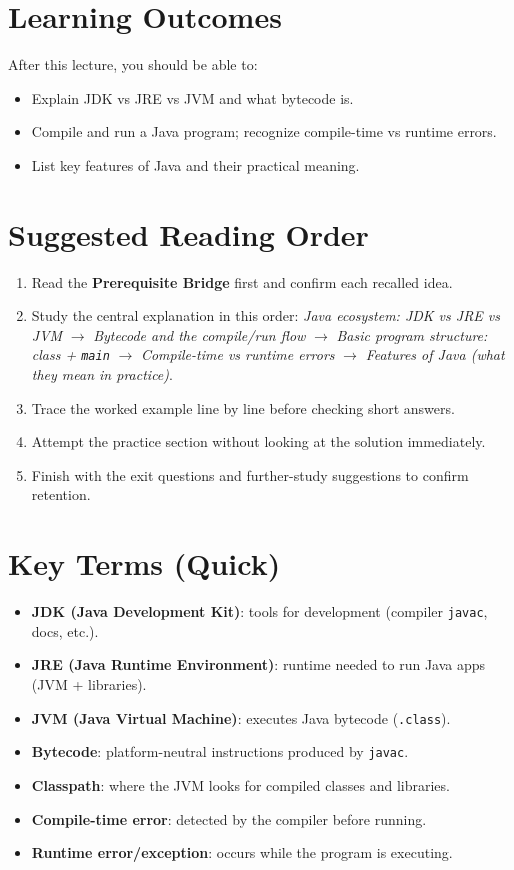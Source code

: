 \documentclass[11pt]{article}
\begin{document}
\section{Learning Outcomes}
After this lecture, you should be able to:
\begin{itemize}
  \item Explain JDK vs JRE vs JVM and what bytecode is.
  \item Compile and run a Java program; recognize compile-time vs runtime errors.
  \item List key features of Java and their practical meaning.
\end{itemize}

\section{Suggested Reading Order}
\begin{enumerate}
  \item Read the \textbf{Prerequisite Bridge} first and confirm each recalled idea.
  \item Study the central explanation in this order: \textit{Java ecosystem: JDK vs JRE vs JVM} $\rightarrow$ \textit{Bytecode and the compile/run flow} $\rightarrow$ \textit{Basic program structure: class + \texttt{main}} $\rightarrow$ \textit{Compile-time vs runtime errors} $\rightarrow$ \textit{Features of Java (what they mean in practice)}.
  \item Trace the worked example line by line before checking short answers.
  \item Attempt the practice section without looking at the solution immediately.
  \item Finish with the exit questions and further-study suggestions to confirm retention.
\end{enumerate}
\notesources{\OOPSUnitISources}

\section{Key Terms (Quick)}
\begin{itemize}
  \item \textbf{JDK (Java Development Kit)}: tools for development (compiler \texttt{javac}, docs, etc.).
  \item \textbf{JRE (Java Runtime Environment)}: runtime needed to run Java apps (JVM + libraries).
  \item \textbf{JVM (Java Virtual Machine)}: executes Java bytecode (\texttt{.class}).
  \item \textbf{Bytecode}: platform-neutral instructions produced by \texttt{javac}.
  \item \textbf{Classpath}: where the JVM looks for compiled classes and libraries.
  \item \textbf{Compile-time error}: detected by the compiler before running.
  \item \textbf{Runtime error/exception}: occurs while the program is executing.
\end{itemize}
\end{document}
